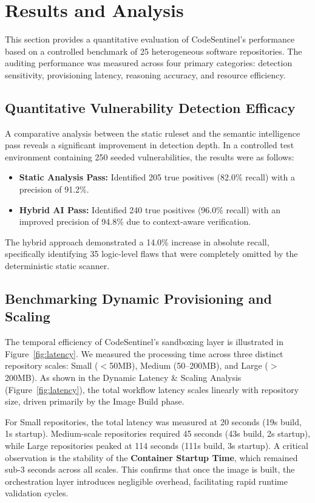 \section{Results and Analysis}
\label{sec:results}

This section provides a quantitative evaluation of CodeSentinel’s performance based on a controlled benchmark of 25 heterogeneous software repositories. The auditing performance was measured across four primary categories: detection sensitivity, provisioning latency, reasoning accuracy, and resource efficiency.

\subsection{Quantitative Vulnerability Detection Efficacy}

A comparative analysis between the static ruleset and the semantic intelligence pass reveals a significant improvement in detection depth. In a controlled test environment containing 250 seeded vulnerabilities, the results were as follows:

\begin{itemize}
    \item \textbf{Static Analysis Pass:} Identified 205 true positives (82.0\% recall) with a precision of 91.2\%.
    \item \textbf{Hybrid AI Pass:} Identified 240 true positives (96.0\% recall) with an improved precision of 94.8\% due to context-aware verification.
\end{itemize}

The hybrid approach demonstrated a 14.0\% increase in absolute recall, specifically identifying 35 logic-level flaws that were completely omitted by the deterministic static scanner.

\subsection{Benchmarking Dynamic Provisioning and Scaling}

The temporal efficiency of CodeSentinel's sandboxing layer is illustrated in Figure~\ref{fig:latency}. We measured the processing time across three distinct repository scales: Small ($<$50MB), Medium (50--200MB), and Large ($>$200MB). As shown in the Dynamic Latency \& Scaling Analysis (Figure~\ref{fig:latency}), the total workflow latency scales linearly with repository size, driven primarily by the Image Build phase.

For Small repositories, the total latency was measured at 20 seconds (19s build, 1s startup). Medium-scale repositories required 45 seconds (43s build, 2s startup), while Large repositories peaked at 114 seconds (111s build, 3s startup). A critical observation is the stability of the \textbf{Container Startup Time}, which remained sub-3 seconds across all scales. This confirms that once the image is built, the orchestration layer introduces negligible overhead, facilitating rapid runtime validation cycles.


